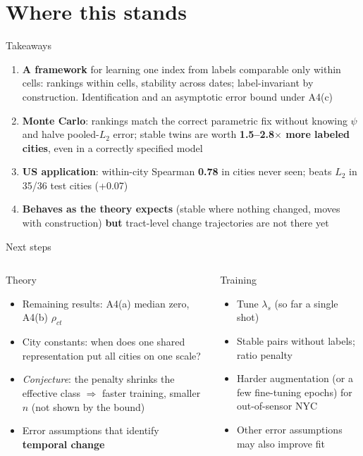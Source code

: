 \documentclass[10pt,aspectratio=169]{beamer}
\begin{document}
\section{Where this stands}

\begin{frame}{Takeaways}
\small
\begin{enumerate}
  \item \textbf{A framework} for learning one index from labels comparable only within cells: rankings within cells, stability across dates; label-invariant by construction. Identification and an asymptotic error bound under A4(c)
  \item \textbf{Monte Carlo}: rankings match the correct parametric fix without knowing $\psi$ and halve pooled-$L_2$ error; stable twins are worth \textbf{1.5--2.8$\times$ more labeled cities}, even in a correctly specified model
  \item \textbf{US application}: within-city Spearman \textbf{0.78} in cities never seen; beats $L_2$ in 35/36 test cities (+0.07)
  \item \textbf{Behaves as the theory expects} (stable where nothing changed, moves with construction) \textbf{but} tract-level change trajectories are not there yet
\end{enumerate}
\end{frame}

\begin{frame}{Next steps}
\begin{columns}[T]
\begin{tbox}[violet]{Theory}
\footnotesize
\begin{itemize}
  \item Remaining results: A4(a) median zero, A4(b) $\rho_{ct}$
  \item City constants: when does one shared representation put all cities on one scale?
  \item \emph{Conjecture}: the penalty shrinks the effective class $\Rightarrow$ faster training, smaller $n$ (not shown by the bound)
  \item Error assumptions that identify \textbf{temporal change}
\end{itemize}
\end{tbox}
\begin{tbox}[blue]{Training}
\footnotesize
\begin{itemize}
  \item Tune $\lambda_s$ (so far a single shot)
  \item Stable pairs without labels; ratio penalty
  \item Harder augmentation (or a few fine-tuning epochs) for out-of-sensor NYC
  \item Other error assumptions may also improve fit
\end{itemize}
\end{tbox}
\end{columns}
\end{frame}
\end{document}
